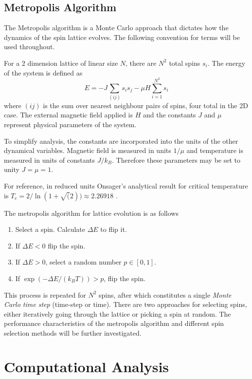 \documentclass[a4paper, 12pt]{article}
\begin{document}
	\subsection{Metropolis Algorithm}
The Metropolis algorithm is a Monte Carlo approach that dictates how the dynamics of the spin lattice evolves. The following convention for terms will be used throughout.

For a 2 dimension lattice of linear size \(N\), there are \(N^2\) total spins \(s_i\). The energy of the system is defined as
\[ E = - J  \sum_{(ij)}{s_i s_j} - \mu H \sum_{i=1}^{N^2} s_i \]
where \( (ij) \) is the sum over nearest neighbour pairs of spins, four total in the 2D case. The external magnetic field applied is \( H \) and the constants \(J\) and \( \mu \) represent physical parameters of the system. 

To simplify analysis, the constants are incorporated into the units of the other dynamical variables. Magnetic field is measured in units \(1 / \mu \) and temperature is measured in units of constants \( J / k_B \). Therefore these parameters may be set to unity \(J = \mu = 1\). 

For reference, in reduced units Onsager's analytical result for critical temperature is \( T_c = 2/\ln(1+\sqrt(2)) \approx 2.26918 \) \cite{1}.

The metropolis algorithm for lattice evolution is as follows
\begin{enumerate}
  \item Select a spin. Calculate \( \Delta E \) to flip it.
  \item If \( \Delta E < 0 \) flip the spin.
  \item If \( \Delta E > 0 \), select a random number \(p \in [0,1] \).
  \item If \( \exp(- \Delta E / (k_B T) ) > p \), flip the spin.
\end{enumerate}

This process is repeated for \(N^2\) spins, after which constitutes a single {\it Monte Carlo time step} (time-step or time). There are two approaches for selecting spins, either iteratively going through the lattice or picking a spin at random. The performance characteristics of the metropolis algorithm and different spin selection methods will be further investigated.


    \newpage
    \section{Computational Analysis}
    
\end{document}
